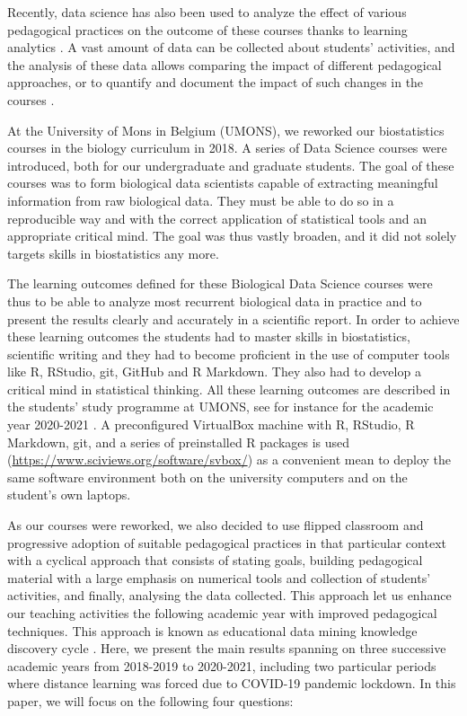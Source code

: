 \documentclass{aims}
\theoremstyle{definition}
\begin{document}
Recently, data science has also been used to analyze the effect of
various pedagogical practices on the outcome of these courses thanks to
learning analytics \cite{Estrellado2020}. A vast amount of data can be
collected about students' activities, and the analysis of these data
allows comparing the impact of different pedagogical approaches, or to
quantify and document the impact of such changes in the courses
\cite{Romero2020}.

At the University of Mons in Belgium (UMONS), we reworked our
biostatistics courses in the biology curriculum in 2018. A series of
Data Science courses were introduced, both for our undergraduate and
graduate students. The goal of these courses was to form biological data
scientists capable of extracting meaningful information from raw
biological data. They must be able to do so in a reproducible way and
with the correct application of statistical tools and an appropriate
critical mind. The goal was thus vastly broaden, and it did not solely
targets skills in biostatistics any more.

The learning outcomes defined for these Biological Data Science courses
were thus to be able to analyze most recurrent biological data in
practice and to present the results clearly and accurately in a
scientific report. In order to achieve these learning outcomes the
students had to master skills in biostatistics, scientific writing and
they had to become proficient in the use of computer tools like R,
RStudio, git, GitHub and R Markdown. They also had to develop a critical
mind in statistical thinking. All these learning outcomes are described
in the students' study programme at UMONS, see for instance for the
academic year 2020-2021 \cite{ds1bio2021, ds2bio2021, ds3bio2021}. A
preconfigured VirtualBox machine with R, RStudio, R Markdown, git, and a
series of preinstalled R packages is used
(\url{https://www.sciviews.org/software/svbox/}) as a convenient mean to
deploy the same software environment both on the university computers
and on the student's own laptops.

As our courses were reworked, we also decided to use flipped classroom
and progressive adoption of suitable pedagogical practices in that
particular context with a cyclical approach that consists of stating
goals, building pedagogical material with a large emphasis on numerical
tools and collection of students' activities, and finally, analysing the
data collected. This approach let us enhance our teaching activities the
following academic year with improved pedagogical techniques. This
approach is known as educational data mining knowledge discovery cycle
\cite{Romero2020}. Here, we present the main results spanning on three
successive academic years from 2018-2019 to 2020-2021, including two
particular periods where distance learning was forced due to COVID-19
pandemic lockdown. In this paper, we will focus on the following four
questions:
\end{document}
